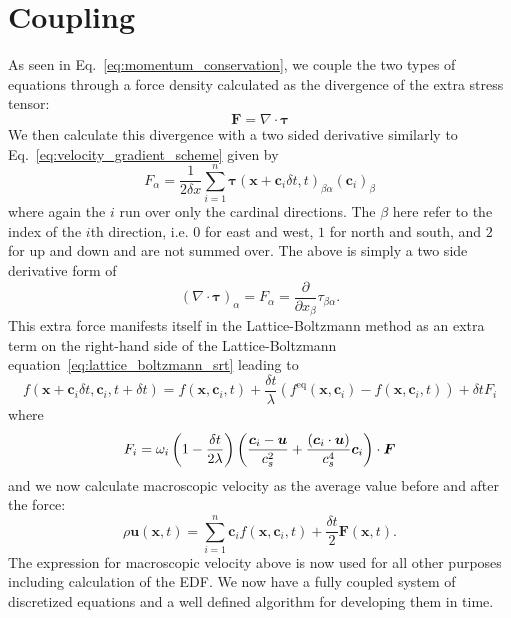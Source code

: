 \section{Coupling}
As seen in Eq.~\eqref{eq:momentum_conservation}, we couple the two types of equations through a force density calculated as the divergence of the extra stress tensor:
\begin{equation}
\bm{F} = \nabla \cdot \bm{\tau}
\end{equation}
We then calculate this divergence with a two sided derivative similarly to Eq.~\eqref{eq:velocity_gradient_scheme} given by
\begin{equation}\label{eq:divergence_scheme}
F_\alpha = \frac{1}{2\delta x}\sum_{i=1}^n\bm{\tau}(\bm{x}+\bm{c}_i\delta t,t)_{\beta \alpha}(\bm{c}_i)_\beta
\end{equation}
where again the $i$ run over only the cardinal directions. The $\beta$ here refer to the index of the $i$th direction, i.e. $0$ for east and west, $1$ for north and south, and $2$ for up and down and are not summed over. The above is simply a two side derivative form of 
\begin{equation}
(\nabla \cdot \bm{\tau})_\alpha = F_\alpha = \frac{\partial}{\partial x_\beta} \tau_{\beta \alpha} .
\end{equation}
This extra force manifests itself in the Lattice-Boltzmann method as an extra term on the right-hand side of the Lattice-Boltzmann equation~\eqref{eq:lattice_boltzmann_srt} leading to
\begin{equation}\label{eq:forced_lattice_boltzmann_srt}
f(\bm{x} +\bm{c}_i\delta t, \bm{c}_i, t + \delta t) = f(\bm{x},\bm{c}_i,t) + \frac{\delta t}{\lambda} \left(f^{\mathrm{eq}}(\bm{x},\bm{c}_i) - f(\bm{x},\bm{c}_i, t)\right) + \delta t F_i
\end{equation}
where
\begin{equation}
F_i = \omega_i \left(1-\frac{\delta t}{2 \lambda}\right) \left( \frac{\bm{c}_i - \bm{u}}{c_s^2} + \frac{(\bm{c}_i \cdot \bm{u})}{c_s^4}\bm{c}_i\right)\cdot\bm{F}
\end{equation}
and we now calculate macroscopic velocity as the average value before and after the force:
\begin{equation}\label{eq:forced_macroscopic_velocity} 
\rho\bm{u}(\bm{x},t) = \sum_{i=1}^n\bm{c}_i f(\bm{x},\bm{c}_i,t) + \frac{\delta t}{2} \bm{F}(\bm{x},t).
\end{equation}
The expression for macroscopic velocity above is now used for all other purposes including calculation of the EDF. We now have a fully coupled system of discretized equations and a well defined algorithm for developing them in time. 

